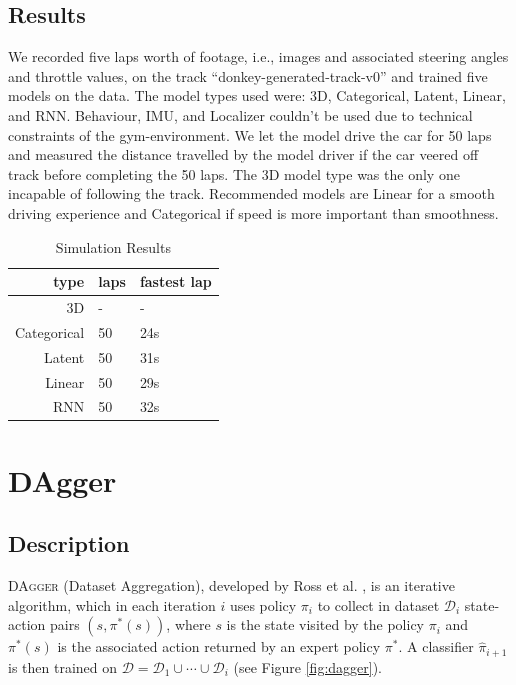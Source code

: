 \documentclass[conference]{IEEEtran}
\begin{document}
\subsection{Results}

We recorded five laps worth of footage, i.e., images and associated steering angles and throttle values, on the track ``donkey-generated-track-v0'' and trained five models on the data. The model types used were: 3D, Categorical, Latent, Linear, and RNN. Behaviour, IMU, and Localizer couldn't be used due to technical constraints of the gym-environment. We let the model drive the car for 50 laps and measured the distance travelled by the model driver if the car veered off track before completing the 50 laps. The 3D model type was the only one incapable of following the track. Recommended models are Linear for a smooth driving experience and Categorical if speed is more important than smoothness.

\begin{table}[!t]
\renewcommand{\arraystretch}{1.3}
\caption{Simulation Results}
\centering
\begin{tabular}{rll}
type&laps&fastest lap\\
\hline
3D&-&-\\
Categorical&50&24s\\
Latent&50&31s\\
Linear&50&29s\\
RNN&50&32s\\
\end{tabular}
\label{tab:simresults}
\end{table}

\section{DAgger}

\subsection{Description}

DA\textsc{gger} (Dataset Aggregation), developed by Ross et al. \cite{Ross2011}, is an iterative algorithm, which in each iteration \( i \) uses policy \( \pi_i \) to collect in dataset \( \mathcal{D}_i \) state-action pairs \( (s,\pi^*(s)) \), where \( s \) is the state visited by the policy \( \pi_i \) and \( \pi^*(s) \) is the associated action returned by an expert policy \( \pi^* \). A classifier \( \hat{ \pi}_{i+1} \) is then trained on \( \mathcal{D} = \mathcal{D}_1 \cup \dotsm \cup \mathcal{D}_i \) (see Figure \ref{fig:dagger}).
\end{document}
